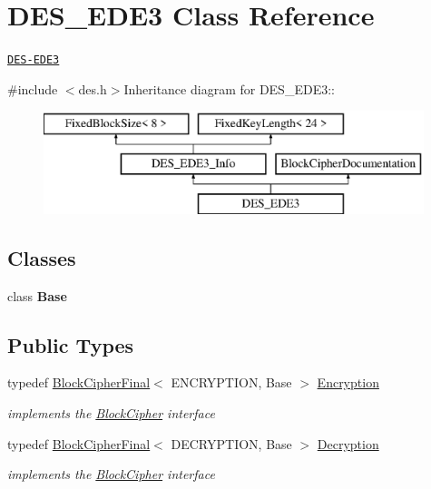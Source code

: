 \hypertarget{class_d_e_s___e_d_e3}{
\section{DES\_\-EDE3 Class Reference}
\label{class_d_e_s___e_d_e3}
}


\href{http://www.weidai.com/scan-mirror/cs.html#DESede}{\tt DES-\/EDE3}  


{\ttfamily \#include $<$des.h$>$}Inheritance diagram for DES\_\-EDE3::\begin{figure}[H]
\begin{center}
\leavevmode
\includegraphics[height=3cm]{class_d_e_s___e_d_e3}
\end{center}
\end{figure}
\subsection*{Classes}
\begin{DoxyCompactItemize}
\item 
class {\bfseries Base}
\end{DoxyCompactItemize}
\subsection*{Public Types}
\begin{DoxyCompactItemize}
\item 
\hypertarget{class_d_e_s___e_d_e3_af49c33eb7f3fa0bb1402a68584af10dd}{
typedef \hyperlink{class_block_cipher_final}{BlockCipherFinal}$<$ ENCRYPTION, Base $>$ \hyperlink{class_d_e_s___e_d_e3_af49c33eb7f3fa0bb1402a68584af10dd}{Encryption}}
\label{class_d_e_s___e_d_e3_af49c33eb7f3fa0bb1402a68584af10dd}

\begin{DoxyCompactList}\small\item\em implements the \hyperlink{class_block_cipher}{BlockCipher} interface \item\end{DoxyCompactList}\item 
\hypertarget{class_d_e_s___e_d_e3_a86f667385b1ee50d945aa1cb6a05a369}{
typedef \hyperlink{class_block_cipher_final}{BlockCipherFinal}$<$ DECRYPTION, Base $>$ \hyperlink{class_d_e_s___e_d_e3_a86f667385b1ee50d945aa1cb6a05a369}{Decryption}}
\label{class_d_e_s___e_d_e3_a86f667385b1ee50d945aa1cb6a05a369}

\begin{DoxyCompactList}\small\item\em implements the \hyperlink{class_block_cipher}{BlockCipher} interface \item\end{DoxyCompactList}\end{DoxyCompactItemize}


